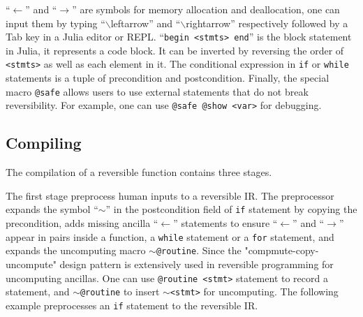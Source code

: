 \documentclass[aps,twocolumn,longbibliography,english,superscriptaddress]{revtex4-1}
\newcommand{\<}{\langle}
\renewcommand{\>}{\rangle}
\theoremstyle{definition}\newtheorem{definition}{\textit{Definition}}
\begin{document}
``\texttt{$\leftarrow$}'' and ``\texttt{$\rightarrow$}'' are symbols for memory allocation and deallocation, one can input them by typing ``$\backslash$leftarrow'' and ``$\backslash$rightarrow'' respectively followed by a Tab key in a Julia editor or REPL.
``\texttt{begin <stmts> end}'' is the block statement in Julia, it represents a code block.
It can be inverted by reversing the order of \texttt{<stmts>} as well as each element in it.
The conditional expression in \texttt{if} or \texttt{while} statements is a tuple of precondition and postcondition.
Finally, the special macro \texttt{@safe} allows users to use external statements that do not break reversibility.
For example, one can use \texttt{@safe @show <var>} for debugging.

\subsection{Compiling}
The compilation of a reversible function contains three stages.

The first stage preprocess human inputs to a reversible IR.
The preprocessor expands the symbol ``\texttt{$\sim$}'' in the postcondition field of \texttt{if} statement by copying the precondition, adds missing ancilla ``$\leftarrow$'' statements to ensure ``\texttt{$\leftarrow$}'' and ``\texttt{$\rightarrow$}'' appear in pairs inside a function, a \texttt{while} statement or a \texttt{for} statement, and expands the uncomputing macro \texttt{$\sim$@routine}.
Since the "compmute-copy-uncompute" design pattern is extensively used in reversible programming for uncomputing ancillas.
One can use \texttt{@routine <stmt>} statement to record a statement, and \texttt{$\sim$@routine} to insert \texttt{$\sim$<stmt>} for uncomputing. 
The following example preprocesses an \texttt{if} statement to the reversible IR.
\end{document}
